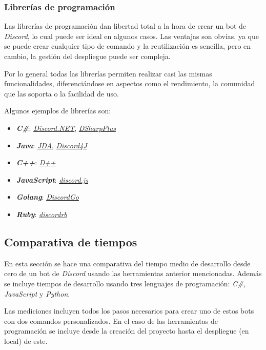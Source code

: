 \subsubsection{Librerías de programación}

Las librerías de programación dan libertad total a la hora de crear un bot de \textit{Discord}, lo cual puede ser ideal en algunos casos. Las ventajas son obvias, ya que se puede crear cualquier tipo de comando y la reutilización es sencilla, pero en cambio, la gestión del despliegue puede ser compleja.

Por lo general todas las librerías permiten realizar casi las mismas funcionalidades, diferenciándose en aspectos como el rendimiento, la comunidad que las soporta o la facilidad de uso.

Algunos ejemplos de librerías son:

\begin{itemize}
	\item \textbf{\textit{C\#}}: \href{https://discordnet.dev/}{\textit{Discord.NET}}, \href{https://github.com/DSharpPlus/DSharpPlus}{\textit{DSharpPlus}}
	\item \textbf{\textit{Java}}: \href{https://github.com/DV8FromTheWorld/JDA}{\textit{JDA}}, \href{https://discord4j.com/}{\textit{Discord4J}}
	\item \textbf{\textit{C++}}: \href{https://dpp.dev/}{\textit{D++}}
	\item \textbf{\textit{JavaScript}}: \href{https://discord.js.org/}{\textit{discord.js}}
	\item \textbf{\textit{Golang}}: \href{https://github.com/bwmarrin/discordgo}{\textit{DiscordGo}}
	\item \textbf{\textit{Ruby}}: \href{https://github.com/shardlab/discordrb}{\textit{discordrb}}
\end{itemize}


\subsection{Comparativa de tiempos}

En esta sección se hace una comparativa del tiempo medio de desarrollo desde cero de un bot de \textit{Discord} usando las herramientas anterior mencionadas. Además se incluye tiempos de desarrollo usando tres lenguajes de programación: \textit{C\#}, \textit{JavaScript} y \textit{Python}.

Las mediciones incluyen todos los pasos necesarios para crear uno de estos bots con dos comandos personalizados. En el caso de las herramientas de programación se incluye desde la creación del proyecto hasta el despliegue (en local) de este.

